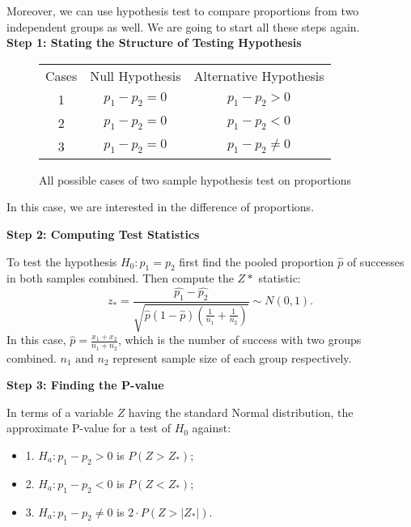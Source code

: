 Moreover, we can use hypothesis test to compare proportions from two independent groups as well. We are going to start all these steps again.\\

\textbf{Step 1: Stating the Structure of Testing Hypothesis}

\begin{center}
\begin{figure}[H]
\centering
\begin{tabular}{ c c c }
Cases & Null Hypothesis & Alternative Hypothesis \\
     1	   & $p_1 - p_2 = 0$ & $p_1 - p_2 > 0$ \\
     2	   & $p_1 - p_2 = 0$ & $p_1 - p_2 < 0$ \\
     3    & $p_1 - p_2 = 0$ & $p_1 - p_2 \neq 0$ \\
\end{tabular}
\caption{All possible cases of two sample hypothesis test on proportions}
\end{figure}
\end{center}
\vspace{-0.75cm}

In this case, we are interested in the difference of proportions.

\textbf{Step 2: Computing Test Statistics}

\begin{definition}
To test the hypothesis $H_0 : p_1 = p_2$ first find the pooled proportion $\hat{p}$ of successes in both samples combined. Then compute the $Z*$ statistic: \[ z_* = \frac{\hat{p_1}-\hat{p_2}}{\sqrt{\hat{p}(1-\hat{p})(\frac{1}{n_1}+ \frac{1}{n_2})}} \sim N(0,1).\]
In this case, $\hat{p} = \frac{x_1 + x_2}{n_1+n_2}$, which is the number of success with two groups combined. $n_1 \text{ and } n_2$ represent sample size of each group respectively.
\end{definition}

\textbf{Step 3: Finding the P-value}

In terms of a variable $Z$ having the standard Normal distribution, the approximate P-value for a test of $H_0$ against:

\begin{itemize}
	\item 1. $H_a: p_1 - p_2 > 0$ is $P(Z > Z_*)$;
	\item 2. $H_a: p_1 - p_2 < 0$ is $P(Z < Z_*)$;
	\item 3. $H_a: p_1 - p_2 \neq 0$ is $2 \cdot P(Z > |Z_*|)$.
\end{itemize}

